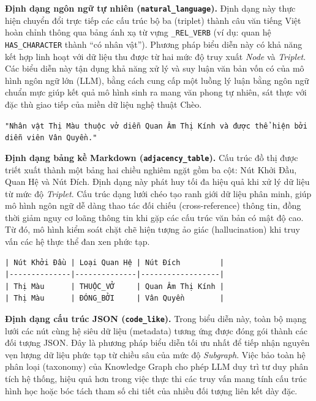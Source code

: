 \textbf{Định dạng ngôn ngữ tự nhiên (\texttt{natural\_language}).} Định dạng này thực hiện chuyển đổi trực tiếp các cấu trúc bộ ba (triplet) thành câu văn tiếng Việt hoàn chỉnh thông qua bảng ánh xạ từ vựng \texttt{\_REL\_VERB} (ví dụ: quan hệ \texttt{HAS\_CHARACTER} thành ``có nhân vật''). Phương pháp biểu diễn này có khả năng kết hợp linh hoạt với dữ liệu thu được từ hai mức độ truy xuất \textit{Node} và \textit{Triplet}. Các biểu diễn này tận dụng khả năng xử lý và suy luận văn bản vốn có của mô hình ngôn ngữ lớn (LLM), bằng cách cung cấp một luồng lý luận bằng ngôn ngữ chuẩn mực giúp kết quả mô hình sinh ra mang văn phong tự nhiên, sát thực với đặc thù giao tiếp của miền dữ liệu nghệ thuật Chèo.

\vspace{0.5em}
\begin{tcolorbox}[colback=gray!5, colframe=black!50, arc=4pt, boxrule=0.5pt, left=4pt, right=4pt, top=4pt, bottom=4pt, boxsep=0pt]
\small \texttt{"Nhân vật Thị Màu thuộc vở diễn Quan Âm Thị Kính và được thể hiện bởi diễn viên Vân Quyền."}
\end{tcolorbox}

\textbf{Định dạng bảng kề Markdown (\texttt{adjacency\_table}).} Cấu trúc đồ thị được triết xuất thành một bảng hai chiều nghiêm ngặt gồm ba cột: Nút Khởi Đầu, Quan Hệ và Nút Đích. Định dạng này phát huy tối đa hiệu quả khi xử lý dữ liệu từ mức độ \textit{Triplet}. Cấu trúc dạng lưới chéo tạo ranh giới dữ liệu phân minh, giúp mô hình ngôn ngữ dễ dàng thao tác đối chiếu (cross-reference) thông tin, đồng thời giảm nguy cơ loãng thông tin khi gặp các cấu trúc văn bản có mật độ cao. Từ đó, mô hình kiểm soát chặt chẽ hiện tượng ảo giác (hallucination) khi truy vấn các hệ thực thể đan xen phức tạp.

\vspace{0.5em}
\begin{tcolorbox}[colback=gray!5, colframe=black!50, arc=4pt, boxrule=0.5pt, left=4pt, right=4pt, top=4pt, bottom=4pt, boxsep=0pt]
\small
\begin{verbatim}
| Nút Khởi Đầu | Loại Quan Hệ | Nút Đích         |
|--------------|--------------|------------------|
| Thị Màu      | THUỘC_VỞ     | Quan Âm Thị Kính |
| Thị Màu      | ĐÓNG_BỞI     | Vân Quyền        |
\end{verbatim}
\end{tcolorbox}

\textbf{Định dạng cấu trúc JSON (\texttt{code\_like}).} Trong biểu diễn này, toàn bộ mạng lưới các nút cùng hệ siêu dữ liệu (metadata) tương ứng được đóng gói thành các đối tượng JSON. Đây là phương pháp biểu diễn tối ưu nhất để tiếp nhận nguyên vẹn lượng dữ liệu phức tạp từ chiều sâu của mức độ \textit{Subgraph}. Việc bảo toàn hệ phân loại (taxonomy) của Knowledge Graph cho phép LLM duy trì tư duy phân tích hệ thống, hiệu quả hơn trong việc thực thi các truy vấn mang tính cấu trúc hình học hoặc bóc tách tham số chi tiết của nhiều đối tượng liên kết dày đặc.

